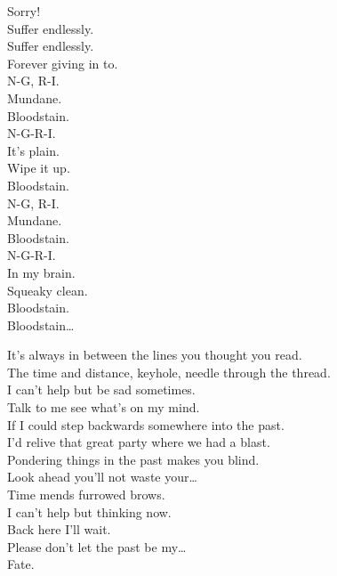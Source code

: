 Sorry! \\

Suffer endlessly. \\
Suffer endlessly. \\
Forever giving in to. \\

N-G, R-I. \\
Mundane. \\
Bloodstain. \\
N-G-R-I. \\
It's plain. \\
Wipe it up. \\
Bloodstain. \\

N-G, R-I. \\
Mundane. \\
Bloodstain. \\
N-G-R-I. \\
In my brain. \\
Squeaky clean. \\
Bloodstain. \\

Bloodstain… \\




It's always in between the lines you thought you read. \\
The time and distance, keyhole, needle through the thread. \\
I can't help but be sad sometimes. \\
Talk to me see what's on my mind. \\

If I could step backwards somewhere into the past. \\
I'd relive that great party where we had a blast. \\
Pondering things in the past makes you blind. \\
Look ahead you'll not waste your… \\

Time mends furrowed brows. \\
I can't help but thinking now. \\
Back here I'll wait. \\
Please don't let the past be my… \\
Fate. \\

